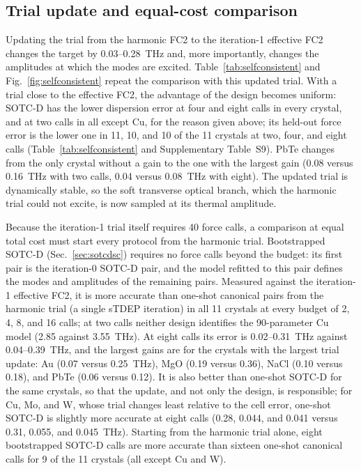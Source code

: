 \documentclass[aip,jap,reprint,amsmath,amssymb,floatfix]{revtex4-2}
\begin{document}


\subsection{Trial update and equal-cost comparison}\label{sec:iter1}

Updating the trial from the harmonic FC2 to the iteration-1 effective FC2
changes the target by 0.03--0.28~THz and, more importantly, changes the
amplitudes at which the modes are excited. Table~\ref{tab:selfconsistent} and
Fig.~\ref{fig:selfconsistent} repeat the comparison with this updated trial.
With a trial close to the effective FC2, the advantage of the design becomes
uniform: SOTC-D has the lower dispersion error at four and eight calls in
every crystal, and at two calls in all except Cu, for the reason given
above; its held-out force error is the lower one in 11, 10, and 10 of the 11
crystals at two, four, and eight calls (Table~\ref{tab:selfconsistent} and
Supplementary Table~S9). PbTe changes from the only crystal without a gain to the one with the
largest gain (0.08 versus 0.16~THz with two calls, 0.04 versus 0.08~THz with
eight). The updated trial is dynamically stable, so the soft transverse
optical branch, which the harmonic trial could not excite, is now sampled at
its thermal amplitude.

Because the iteration-1 trial itself requires 40 force calls, a comparison
at equal total cost must start every protocol from the harmonic trial.
Bootstrapped SOTC-D (Sec.~\ref{sec:sotcdsc}) requires no force calls beyond
the budget: its first pair is the iteration-0 SOTC-D pair, and the model
refitted to this pair defines the modes and amplitudes of the remaining
pairs. Measured against
the iteration-1 effective FC2, it is more accurate than one-shot canonical
pairs from the harmonic trial (a single sTDEP iteration) in all 11 crystals at
every budget of 2, 4, 8, and 16 calls; at two calls neither design identifies
the 90-parameter Cu model (2.85 against 3.55~THz). At eight calls its error is 0.02--0.31~THz
against 0.04--0.39~THz, and the largest gains are for the crystals with the
largest trial update: Au (0.07 versus 0.25~THz), MgO (0.19 versus 0.36),
NaCl (0.10 versus 0.18), and PbTe (0.06 versus 0.12). It is also better than
one-shot SOTC-D for the same crystals, so that the update, and not only the
design, is responsible; for Cu, Mo, and W, whose trial changes least relative
to the cell error, one-shot SOTC-D is slightly more accurate at eight calls
(0.28, 0.044, and 0.041 versus 0.31, 0.055, and 0.045~THz). Starting from the harmonic trial alone, eight
bootstrapped SOTC-D calls are more accurate than sixteen one-shot canonical
calls for 9 of the 11 crystals (all except Cu and W).
\end{document}
